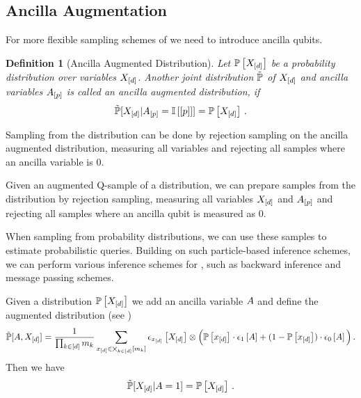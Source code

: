\documentclass[aps,onecolumn,nofootinbib,pra]{article}
\newtheorem{definition}{Definition}
\begin{document}
    \subsection{Ancilla Augmentation}

    For more flexible sampling schemes of \ComputationActivationNetworks{} we need to introduce ancilla qubits.

    \begin{definition}[Ancilla Augmented Distribution]
        Let $\mathbb{P}\left[X_{[d]}\right]$ be a probability distribution over variables $X_{[d]}$.
        Another joint distribution $\tilde{\mathbb{P}}$ of $X_{[d]}$ and ancilla variables $A_{[p]}$ is called an ancilla augmented distribution, if
        \begin{align*}
            \tilde{\mathbb{P}}[X_{[d]}|A_{[p]}=\mathbb{I}\left[[p]\right]] = \mathbb{P}\left[X_{[d]}\right] \, .
        \end{align*}
    \end{definition}

    Sampling from the distribution can be done by rejection sampling on the ancilla augmented distribution, measuring all variables and rejecting all samples where an ancilla variable is $0$.

    Given an augmented Q-sample of a distribution, we can prepare samples from the distribution by rejection sampling, measuring all variables $X_{[d]}$ and $A_{[p]}$ and rejecting all samples where an ancilla qubit is measured as $0$.

    When sampling from probability distributions, we can use these samples to estimate probabilistic queries.
    Building on such particle-based inference schemes, we can perform various inference schemes for \ComputationActivationNetworks{}, such as backward inference and message passing schemes.

    Given a distribution $\mathbb{P}\left[X_{[d]}\right]$ we add an ancilla variable $A$ and define the augmented distribution (see )
    \begin{align*}
        \tilde{\mathbb{P}}[A,X_{[d]}] =
        \frac{1}{\prod_{k\in[d]}m_{k}}
        \sum_{x_{[d]}\in\bigtimes_{k\in[d]}[m_{k}]} \epsilon_{x_{[d]}}\left[X_{[d]}\right]
        \otimes \Big(
        \mathbb{P}\left[x_{[d]}\right] \cdot \epsilon_{1}\left[A\right] + (1- \mathbb{P}\left[x_{[d]}\right]) \cdot \epsilon_{0}\left[A\right]
        \Big) \, .
    \end{align*}
    Then we have
    \begin{align*}
        \tilde{\mathbb{P}}[X_{[d]}|A=1] = \mathbb{P}\left[X_{[d]}\right] \, .
    \end{align*}
\end{document}
